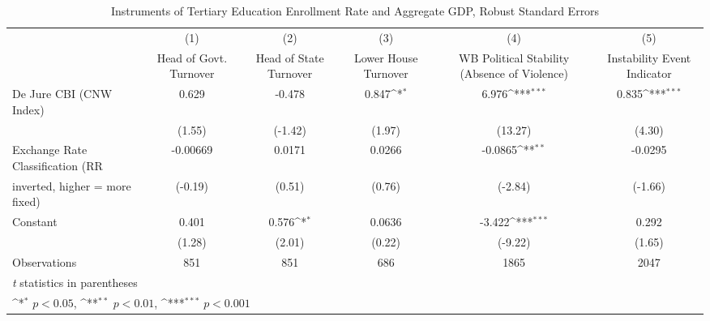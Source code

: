\begin{table}[htbp]\centering
\def\sym#1{\ifmmode^{#1}\else\(^{#1}\)\fi}
\caption{Instruments of Tertiary Education Enrollment Rate and Aggregate GDP, Robust Standard Errors \label{ifivs}}
\begin{tabular}{l*{5}{c}}
\toprule
                                        &\multicolumn{1}{c}{(1)}&\multicolumn{1}{c}{(2)}&\multicolumn{1}{c}{(3)}&\multicolumn{1}{c}{(4)}&\multicolumn{1}{c}{(5)}\\
                                        &\multicolumn{1}{c}{Head of Govt. Turnover}&\multicolumn{1}{c}{Head of State Turnover}&\multicolumn{1}{c}{Lower House Turnover}&\multicolumn{1}{c}{WB Political Stability (Absence of Violence)}&\multicolumn{1}{c}{Instability Event Indicator}\\
\midrule
De Jure CBI (CNW Index)                 &    0.629         &   -0.478         &    0.847\sym{*}  &    6.976\sym{***}&    0.835\sym{***}\\
                                        &   (1.55)         &  (-1.42)         &   (1.97)         &  (13.27)         &   (4.30)         \\
\addlinespace
Exchange Rate Classification (RR        & -0.00669         &   0.0171         &   0.0266         &  -0.0865\sym{**} &  -0.0295         \\
inverted, higher = more fixed)          &  (-0.19)         &   (0.51)         &   (0.76)         &  (-2.84)         &  (-1.66)         \\
\addlinespace
Constant                                &    0.401         &    0.576\sym{*}  &   0.0636         &   -3.422\sym{***}&    0.292         \\
                                        &   (1.28)         &   (2.01)         &   (0.22)         &  (-9.22)         &   (1.65)         \\
\midrule
Observations                            &      851         &      851         &      686         &     1865         &     2047         \\
\bottomrule
\multicolumn{6}{l}{\footnotesize \textit{t} statistics in parentheses}\\
\multicolumn{6}{l}{\footnotesize \sym{*} \(p<0.05\), \sym{**} \(p<0.01\), \sym{***} \(p<0.001\)}\\
\end{tabular}
\end{table}
